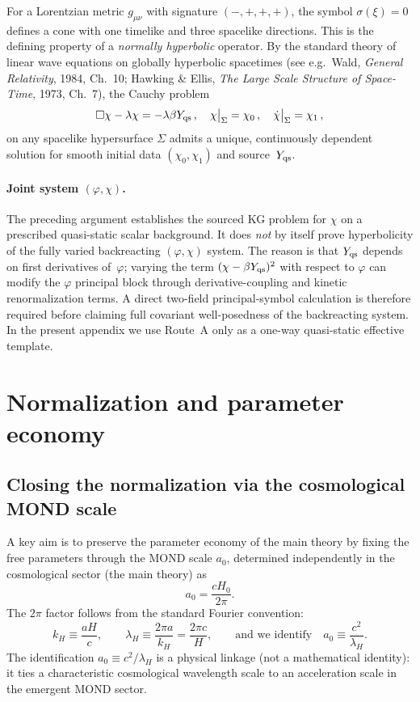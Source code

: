 \documentclass[11pt]{article}
\begin{document}
For a Lorentzian metric $g_{\mu\nu}$ with signature
$(-,+,+,+)$, the symbol $\sigma(\xi) = 0$ defines
a cone with one timelike and three spacelike
directions.  This is the defining property of a
\emph{normally hyperbolic} operator.  By the standard
theory of linear wave equations on globally hyperbolic
spacetimes (see e.g.\ Wald, \textit{General Relativity}, 1984,
Ch.~10; Hawking \& Ellis, \textit{The Large Scale
Structure of Space-Time}, 1973, Ch.~7),
the Cauchy problem
\begin{equation}
\Box\chi - \lambda\chi = -\lambda\beta Y_{\rm qs}\,,\quad
\chi\big|_{\Sigma} = \chi_0\,,\quad
\dot\chi\big|_{\Sigma} = \chi_1\,,
\label{eq:cauchy}
\end{equation}
on any spacelike hypersurface $\Sigma$ admits a
unique, continuously dependent solution for smooth
initial data $(\chi_0,\chi_1)$ and source~$Y_{\rm qs}$.

\paragraph{Joint system $(\varphi,\chi)$.}
The preceding argument establishes the sourced KG problem for
$\chi$ on a prescribed quasi-static scalar background.  It does
\emph{not} by itself prove hyperbolicity of the fully varied
backreacting $(\varphi,\chi)$ system.  The reason is that
$Y_{\rm qs}$ depends on first derivatives of~$\varphi$; varying the
term $(\chi-\beta Y_{\rm qs})^2$ with respect to $\varphi$ can modify
the $\varphi$ principal block through derivative-coupling and kinetic
renormalization terms.  A direct two-field principal-symbol
calculation is therefore required before claiming full covariant
well-posedness of the backreacting system.  In the present appendix
we use Route~A only as a one-way quasi-static effective template.

\section{Normalization and parameter economy}\label{sec:norm}
\subsection{Closing the normalization via the cosmological MOND scale}
A key aim is to preserve the parameter economy of the main theory by fixing the free parameters through the MOND scale $a_0$, determined independently in the cosmological sector (the main theory) as
\begin{equation}
a_0 = \frac{cH_0}{2\pi}.
\label{eq:a0}
\end{equation}
The $2\pi$ factor follows from the standard Fourier convention:
\begin{equation}
k_H \equiv \frac{aH}{c},\qquad
\lambda_H \equiv \frac{2\pi a}{k_H}=\frac{2\pi c}{H},\qquad
\text{and we identify}\quad a_0 \equiv \frac{c^2}{\lambda_H}.
\end{equation}
The identification $a_0\equiv c^2/\lambda_H$ is a physical linkage (not a mathematical identity): it ties a characteristic cosmological wavelength scale to an acceleration scale in the emergent MOND sector.
\end{document}
